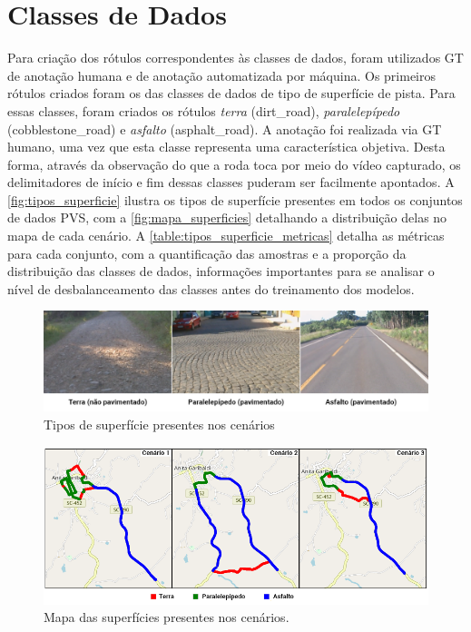 \section{Classes de Dados}

Para criação dos rótulos correspondentes às classes de dados, foram utilizados GT de anotação humana e de anotação automatizada por máquina. Os primeiros rótulos criados foram os das classes de dados de tipo de superfície de pista. Para essas classes, foram criados os rótulos \emph{terra} (dirt\_road), \emph{paralelepípedo} (cobblestone\_road) e \emph{asfalto} (asphalt\_road). A anotação foi realizada via GT humano, uma vez que esta classe representa uma característica objetiva. Desta forma, através da observação do que a roda toca por meio do vídeo capturado, os delimitadores de início e fim dessas classes puderam ser facilmente apontados. A \autoref{fig:tipos_superficie} ilustra os tipos de superfície presentes em todos os conjuntos de dados PVS, com a \autoref{fig:mapa_superficies} detalhando a distribuição delas no mapa de cada cenário. A \autoref{table:tipos_superficie_metricas} detalha as métricas para cada conjunto, com a quantificação das amostras e a proporção da distribuição das classes de dados, informações importantes para se analisar o nível de desbalanceamento das classes antes do treinamento dos modelos. 

\begin{figure}[H]
  \centering
  \caption{Tipos de superfície presentes nos cenários}
   \label{fig:tipos_superficie}
   \includegraphics[width=1\textwidth]{figuras/fig_23.png}
\end{figure}

\begin{figure}[H]
  \centering
  \caption{Mapa das superfícies presentes nos cenários.}
   \label{fig:mapa_superficies}
   \includegraphics[width=1\textwidth]{figuras/fig_25.png}
\end{figure}

